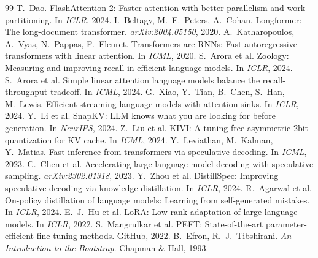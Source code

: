 \documentclass{article}
\begin{document}
\begin{thebibliography}{99}
 T.~Dao. FlashAttention-2: Faster attention with better parallelism and work partitioning. In \emph{ICLR}, 2024.
 I.~Beltagy, M.~E.~Peters, A.~Cohan. Longformer: The long-document transformer. \emph{arXiv:2004.05150}, 2020.
 A.~Katharopoulos, A.~Vyas, N.~Pappas, F.~Fleuret. Transformers are RNNs: Fast autoregressive transformers with linear attention. In \emph{ICML}, 2020.
 S.~Arora et al. Zoology: Measuring and improving recall in efficient language models. In \emph{ICLR}, 2024.
 S.~Arora et al. Simple linear attention language models balance the recall-throughput tradeoff. In \emph{ICML}, 2024.
 G.~Xiao, Y.~Tian, B.~Chen, S.~Han, M.~Lewis. Efficient streaming language models with attention sinks. In \emph{ICLR}, 2024.
 Y.~Li et al. SnapKV: LLM knows what you are looking for before generation. In \emph{NeurIPS}, 2024.
 Z.~Liu et al. KIVI: A tuning-free asymmetric 2bit quantization for KV cache. In \emph{ICML}, 2024.
 Y.~Leviathan, M.~Kalman, Y.~Matias. Fast inference from transformers via speculative decoding. In \emph{ICML}, 2023.
 C.~Chen et al. Accelerating large language model decoding with speculative sampling. \emph{arXiv:2302.01318}, 2023.
 Y.~Zhou et al. DistillSpec: Improving speculative decoding via knowledge distillation. In \emph{ICLR}, 2024.
 R.~Agarwal et al. On-policy distillation of language models: Learning from self-generated mistakes. In \emph{ICLR}, 2024.
 E.~J.~Hu et al. LoRA: Low-rank adaptation of large language models. In \emph{ICLR}, 2022.
 S.~Mangrulkar et al. PEFT: State-of-the-art parameter-efficient fine-tuning methods. GitHub, 2022.
 B.~Efron, R.~J.~Tibshirani. \emph{An Introduction to the Bootstrap}. Chapman \& Hall, 1993.
\end{thebibliography}
\normalsize

\appendix
\end{document}
